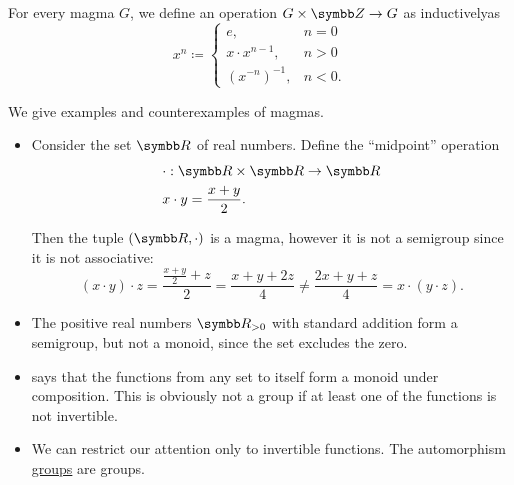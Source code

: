 \begin{definition}\label{def:magma_exponentiation}
  For every magma \( G \), we define an operation \( G \times \BZ \to G \) as inductively\IND as
  \begin{equation*}
    x^n \coloneqq \begin{cases}
      e,               & n = 0  \\
      x \cdot x^{n-1}, & n > 0  \\
      (x^{-n})^{-1},   & n < 0.
    \end{cases}
  \end{equation*}
\end{definition}

\begin{example}\label{ex:magmas}
  We give examples and counterexamples of magmas.

  \begin{itemize}
    \item Consider the set \( \BR \) of real numbers. Define the \enquote{midpoint} operation
          \begin{align*}
             & \cdot: \BR \times \BR \to \BR \\
             & x \cdot y = \frac {x + y} 2.
          \end{align*}

          Then the tuple \( (\BR, \cdot) \) is a magma, however it is not a semigroup since it is not associative:
          \begin{equation*}
            (x \cdot y) \cdot z = \frac {{\frac {x + y} 2} + z} 2 = \frac {x + y + 2z} 4
            \neq
            \frac {2x + y + z} 4 = x \cdot (y \cdot z).
          \end{equation*}

    \item The positive real numbers \( \BR_{>0} \) with standard addition form a semigroup, but not a monoid, since the set excludes the zero.

    \item {} says that the functions from any set to itself form a monoid under composition. This is obviously not a group if at least one of the functions is not invertible.

    \item We can restrict our attention only to invertible functions. The automorphism \hyperref[def:automorphism_group]{groups} are groups.
  \end{itemize}
\end{example}

